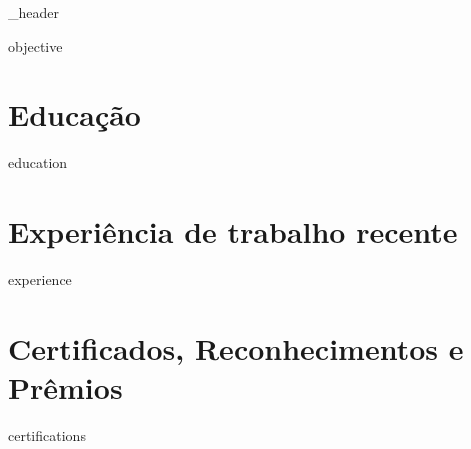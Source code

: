 \documentclass[letter,10pt]{article}
\author{Gabriel Costa De Oliveira} %
\begin{document}
{_header}

{objective}
\vspace*{21pt}




\section{\Large Educação}
\vspace*{21pt}
{education}
\vspace*{21pt}






\section{\Large Experiência de trabalho recente}
\vspace*{21pt}
{experience}
\vspace*{21pt}


\section{\Large Certificados, Reconhecimentos e Prêmios}
\vspace*{21pt}
{certifications}
\vspace*{21pt}


\end{document}
